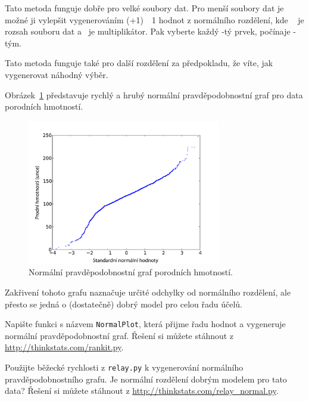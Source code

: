 \documentclass[12pt]{book}
\begin{document}
Tato metoda funguje dobře pro velké soubory dat. Pro menší soubory dat je možné ji vylepšit vygenerováním
\m (\n+1)~\minus~1 hodnot z normálního rozdělení, kde \n~ je rozsah souboru dat a
\m~je multiplikátor.  Pak vyberte každý \m-tý prvek, počínaje \m-tým.


Tato metoda funguje také pro další rozdělení za předpokladu, že víte, jak vygenerovat náhodný výběr.

Obrázek~\ref{nsfg_birthwgt_normal} představuje rychlý a hrubý normální pravděpodobnostní graf pro data porodních hmotností.

\begin{figure}
\centerline{\includegraphics[height=2.5in]{figs/nsfg_birthwgt_normal.pdf}}
\caption{Normální pravděpodobnostní graf porodních hmotností.}
\label{nsfg_birthwgt_normal}
\end{figure}

Zakřivení tohoto grafu naznačuje určité odchylky od normálního rozdělení, ale přesto se jedná o (dostatečně) dobrý model pro celou řadu účelů.

\begin{exercise}
Napište funkci s názvem {\tt NormalPlot}, která přijme řadu hodnot a vygeneruje normální pravděpodobnostní graf. Řešení si můžete stáhnout z \url{http://thinkstats.com/rankit.py}.

Použijte běžecké rychlosti z {\tt relay.py} k vygenerování normálního pravděpodobnostního grafu.
Je normální rozdělení dobrým modelem pro tato data? Řešení si můžete stáhnout z
\url{http://thinkstats.com/relay_normal.py}.

\end{exercise}
\end{document}
